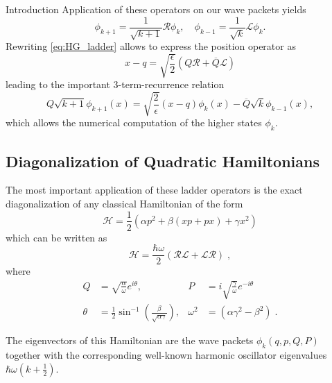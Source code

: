 \begin{chapter}{Introduction}
Application of these operators on our wave packets yields
\begin{equation}
    \label{eq:HG_ladder_applied}
    \phi_{k+1}=\frac{1}{\sqrt{k+1}}\mathcal{R}\phi_k,\quad \phi_{k-1}=\frac{1}{\sqrt{k}}\mathcal{L}\phi_k.
\end{equation}
Rewriting \eqref{eq:HG_ladder} allows to express the position operator as
\begin{equation}
    x-q=\sqrt{\frac{\epsilon}{2}}(Q\mathcal{R}+\overline{Q}\mathcal{L})
\end{equation}
leading to the important 3-term-recurrence relation
\begin{equation}
    Q\sqrt{k+1}\phi_{k+1}(x)=\sqrt{\frac{2}{\epsilon}}(x-q)\phi_k(x)-\overline{Q}\sqrt{k}\phi_{k-1}(x),
\end{equation}
which allows the numerical computation of the higher states $\phi_k$.\\


\subsection{Diagonalization of Quadratic Hamiltonians} %
\label{sub:DiagonalizationHGHam}
The most important application of these ladder operators is the exact diagonalization of any classical Hamiltonian of the form
\begin{equation}
    \label{eq:HG_Hamiltonian}
    \mathcal{H}=\frac{1}{2}\left(\alpha p^2+\beta(xp+px)+\gamma x^2\right)
\end{equation}
which can be written as
\begin{equation}
	\label{eq:HG_OpHamiltonian}
	    \mathcal{H}=\frac{\hbar\omega}{2}(\mathcal{R}\mathcal{L}+\mathcal{L}\mathcal{R})\;,
\end{equation}
where
\begin{align*}
	     Q&=\sqrt{\frac{\alpha}{\omega}}e^{i\theta}, &  P&=i\sqrt{\frac{\gamma}{\omega}}e^{-i\theta}\\
	     \theta&=\frac{1}{2}\sin^{-1}\left(\frac{\beta}{\sqrt{\alpha\gamma}}\right),
	     &\omega^2&=(\alpha\gamma^2-\beta^2)\;.
\end{align*}

The eigenvectors of this Hamiltonian are the wave packets $\phi_k(q,p,Q,P)$ together with the corresponding well-known harmonic oscillator
eigenvalues $\hbar\omega(k+\frac{1}{2})$.\\


\end{chapter}
